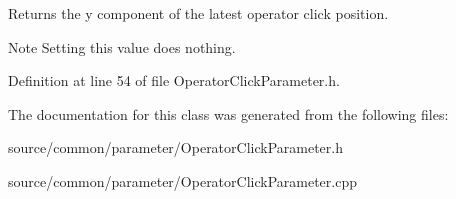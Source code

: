 Returns the y component of the latest operator click position. 

\begin{DoxyNote}{Note}
Setting this value does nothing. 
\end{DoxyNote}


Definition at line 54 of file Operator\-Click\-Parameter.\-h.



The documentation for this class was generated from the following files\-:\begin{DoxyCompactItemize}
\item 
source/common/parameter/Operator\-Click\-Parameter.\-h\item 
source/common/parameter/Operator\-Click\-Parameter.\-cpp\end{DoxyCompactItemize}
